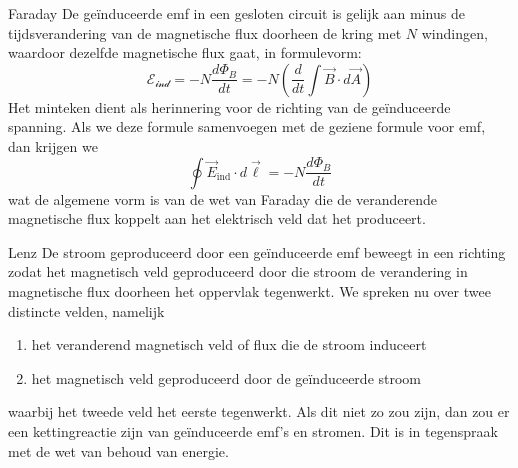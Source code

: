 \begin{lem}[Faraday]{Faraday}
    De geïnduceerde emf in een gesloten circuit is gelijk aan minus de tijdsverandering van de magnetische flux doorheen de kring met $N$ windingen,
    waardoor dezelfde magnetische flux gaat, in formulevorm:
    \begin{equation*}
        \mathcal{E_{\text{ind}}} = -N\dfrac{d\Phi_{B}}{dt} = -N\left(\dfrac{d}{dt} \int \Vec{B} \cdot d\Vec{A}\right)
    \end{equation*}
    Het minteken dient als herinnering voor de richting van de geïnduceerde spanning. Als we deze formule samenvoegen met de geziene formule voor emf, 
    dan krijgen we
    \begin{equation*}
        \oint \Vec{E}_{\text{ind}} \cdot d\Vec{\ell} = -N\dfrac{d\Phi_{B}}{dt}
    \end{equation*}
    wat de algemene vorm is van de wet van Faraday die de veranderende magnetische flux koppelt aan het elektrisch veld dat het produceert.
\end{lem}

\begin{lem}[Lenz]{Lenz}
    De stroom geproduceerd door een geïnduceerde emf beweegt in een richting zodat het magnetisch veld geproduceerd 
    door die stroom de verandering in magnetische flux doorheen het oppervlak tegenwerkt. We spreken nu over twee distincte velden, namelijk
    \begin{enumerate}
        \item het veranderend magnetisch veld of flux die de stroom induceert
        \item het magnetisch veld geproduceerd door de geïnduceerde stroom
    \end{enumerate}
    waarbij het tweede veld het eerste tegenwerkt. Als dit niet zo zou zijn, dan zou er een kettingreactie zijn van
    geïnduceerde emf's en stromen. Dit is in tegenspraak met de wet van behoud van energie.
\end{lem}

